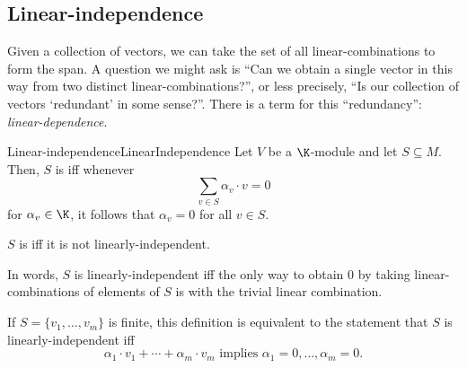 \subsection{Linear-independence}

Given a collection of vectors, we can take the set of all linear-combinations to form the span.  A question we might ask is ``Can we obtain a single vector in this way from two distinct linear-combinations?'', or less precisely, ``Is our collection of vectors `redundant' in some sense?''.  There is a term for this ``redundancy'':  \emph{linear-dependence}.
\begin{dfn}{Linear-independence}{LinearIndependence}
	Let $V$ be a $\K$-module and let $S\subseteq M$.  Then, $S$ is  iff whenever
	\begin{equation}
		\sum _{v\in S}\alpha _v\cdot v=0
	\end{equation}
	for $\alpha _v\in \K$, it follows that $\alpha _v=0$ for all $v\in S$.
	
	$S$ is  iff it is not linearly-independent.
	\begin{rmk}
		In words, $S$ is linearly-independent iff the only way to obtain $0$ by taking linear-combinations of elements of $S$ is with the trivial linear combination.
	\end{rmk}
	\begin{rmk}
		If $S=\{ v_1,\ldots ,v_m\}$ is finite, this definition is equivalent to the statement that $S$ is linearly-independent iff
		\begin{equation}
			\alpha _1\cdot v_1+\cdots +\alpha _m\cdot v_m\text{ implies }\alpha _1=0,\ldots ,\alpha _m=0.
		\end{equation}
		

\end{rmk}
\end{dfn}

